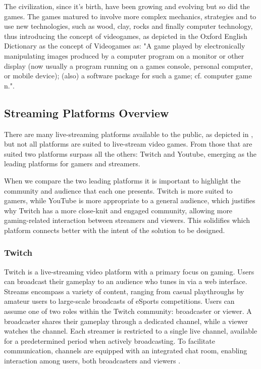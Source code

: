     The civilization, since it's birth, have been growing and evolving but so did the games. The games matured to involve more complex mechanics, strategies and to use new technologies, such as wood, clay, rocks and finally computer technology, thus introducing the concept of videogames, as depicted in the Oxford English Dictionary as the concept of Videogames as: "A game played by electronically manipulating images produced by a computer program on a monitor or other display (now usually a program running on a games console, personal computer, or mobile device); (also) a software package for such a game; cf. computer game n."\cite{videogame_oed}.
    
\subsection{Streaming Platforms Overview}

    There are many live-streaming platforms available to the public, as depicted in \cite{EsportsLiveStreamingPlatforms}, but not all platforms are suited to live-stream video games. From those that are suited two platforms surpass all the others: Twitch and Youtube, emerging as the leading platforms for gamers and streamers.

    When we compare the two leading platforms \cite{TwitchVSYoutube} it is important to highlight the community and audience that each one presents. Twitch is more suited to gamers, while YouTube is more appropriate to a general audience, which justifies why Twitch has a more close-knit and engaged community, allowing more gaming-related interaction between streamers and viewers. This solidifies which platform connects better with the intent of the solution to be designed.

\subsubsection{Twitch}
    Twitch is a live-streaming video platform with a primary focus on gaming. Users can broadcast their gameplay to an audience who tunes in via a web interface. Streams encompass a variety of content, ranging from casual playthroughs by amateur users to large-scale broadcasts of eSports competitions. Users can assume one of two roles within the Twitch community: broadcaster or viewer. A broadcaster shares their gameplay through a dedicated channel, while a viewer watches the channel. Each streamer is restricted to a single live channel, available for a predetermined period when actively broadcasting. To facilitate communication, channels are equipped with an integrated chat room, enabling interaction among users, both broadcasters and viewers \cite{Twitch_streaming_platform}.

